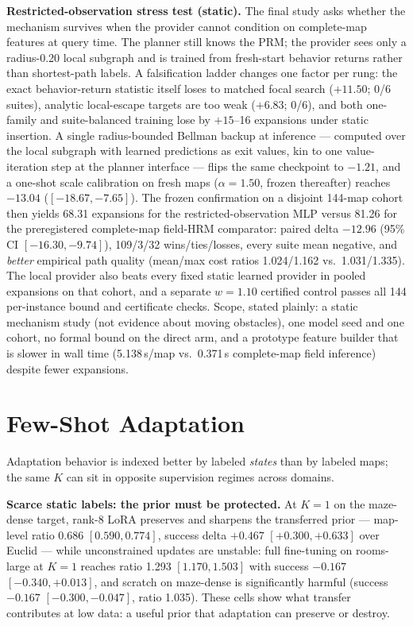 \documentclass[11pt,letterpaper]{article}
\begin{document}
\textbf{Restricted-observation stress test (static).} The final study asks whether the mechanism survives when the provider cannot condition on complete-map features at query time. The planner still knows the PRM; the provider sees only a radius-0.20 local subgraph and is trained from fresh-start behavior returns rather than shortest-path labels. A falsification ladder changes one factor per rung: the exact behavior-return statistic itself loses to matched focal search ($+11.50$; 0/6 suites), analytic local-escape targets are too weak ($+6.83$; 0/6), and both one-family and suite-balanced training lose by $+15$--16 expansions under static insertion. A single radius-bounded Bellman backup at inference --- computed over the local subgraph with learned predictions as exit values, kin to one value-iteration step \citep{tamar2016vin} at the planner interface --- flips the same checkpoint to $-1.21$, and a one-shot scale calibration on fresh maps ($\alpha{=}1.50$, frozen thereafter) reaches $-13.04$ ($[-18.67,-7.65]$). The frozen confirmation on a disjoint 144-map cohort then yields 68.31 expansions for the restricted-observation MLP versus 81.26 for the preregistered complete-map field-HRM comparator: paired delta $-12.96$ (95\% CI $[-16.30,-9.74]$), 109/3/32 wins/ties/losses, every suite mean negative, and \emph{better} empirical path quality (mean/max cost ratios 1.024/1.162 vs.\ 1.031/1.335). The local provider also beats every fixed static learned provider in pooled expansions on that cohort, and a separate $w{=}1.10$ certified control passes all 144 per-instance bound and certificate checks. Scope, stated plainly: a static mechanism study (not evidence about moving obstacles), one model seed and one cohort, no formal bound on the direct arm, and a prototype feature builder that is slower in wall time (5.138\,s/map vs.\ 0.371\,s complete-map field inference) despite fewer expansions.

\section{Few-Shot Adaptation}

Adaptation behavior is indexed better by labeled \emph{states} than by labeled maps; the same $K$ can sit in opposite supervision regimes across domains.

\textbf{Scarce static labels: the prior must be protected.} At $K{=}1$ on the maze-dense target, rank-8 LoRA preserves and sharpens the transferred prior --- map-level ratio 0.686 $[0.590,0.774]$, success delta $+0.467$ $[+0.300,+0.633]$ over Euclid --- while unconstrained updates are unstable: full fine-tuning on rooms-large at $K{=}1$ reaches ratio 1.293 $[1.170,1.503]$ with success $-0.167$ $[-0.340,+0.013]$, and scratch on maze-dense is significantly harmful (success $-0.167$ $[-0.300,-0.047]$, ratio 1.035). These cells show what transfer contributes at low data: a useful prior that adaptation can preserve or destroy.
\end{document}
